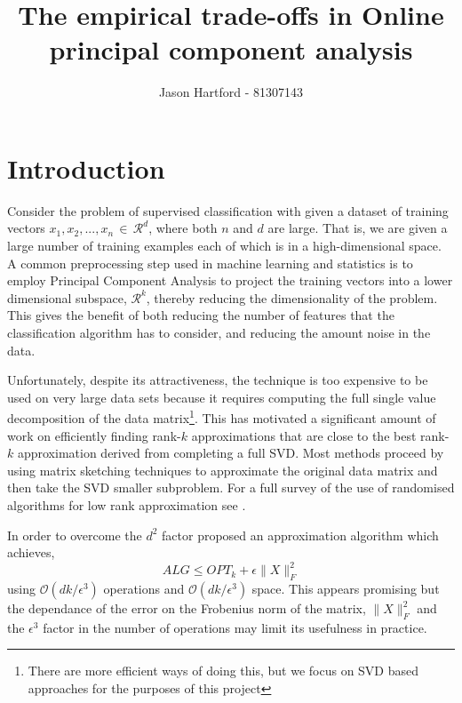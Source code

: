 \documentclass[11pt, oneside]{amsart}
\title{The empirical trade-offs in Online principal component analysis}
\author{Jason Hartford - 81307143}
\begin{document}
\maketitle


\section{Introduction}
Consider the problem of supervised classification with given a dataset of training vectors $x_1, x_2, ... , x_n \, \in \, \mathcal{R}^d$, where both $n$ and $d$ are large. That is, we are given a large number of training examples each of which is in a high-dimensional space. A common preprocessing step used in machine learning and statistics is to employ Principal Component Analysis to project the training vectors into a lower dimensional subspace, $\mathcal{R}^k$, thereby reducing the dimensionality of the problem. This gives the benefit of both reducing the number of features that the classification algorithm has to consider, and reducing the amount noise in the data.

Unfortunately, despite its attractiveness, the technique is too expensive to be used on very large data sets because it requires computing the full single value decomposition of the data matrix\footnote{There are more efficient ways of doing this, but we focus on SVD based approaches for the purposes of this project}. This has motivated a significant amount of work on efficiently finding rank-$k$ approximations that are close to the best rank-$k$ approximation derived from completing a full SVD. Most methods proceed by using matrix sketching techniques to approximate the original data matrix and then take the SVD smaller subproblem. For a full survey of the use of randomised algorithms for low rank approximation see \cite{Woodruff14}.


In order to overcome the $d^2$ factor \cite{onlinepca} proposed an approximation algorithm which achieves,
\[
ALG \leq OPT_k + \epsilon \|X\|_F^2
\]
using $\mathcal{O}(dk/\epsilon^3)$ operations and $\mathcal{O}(dk/\epsilon^3)$ space. This appears promising but the dependance of the error on the Frobenius norm of the matrix, $ \|X\|_F^2$ and the $\epsilon^3$ factor in the number of operations may limit its usefulness in practice. 
\end{document}
